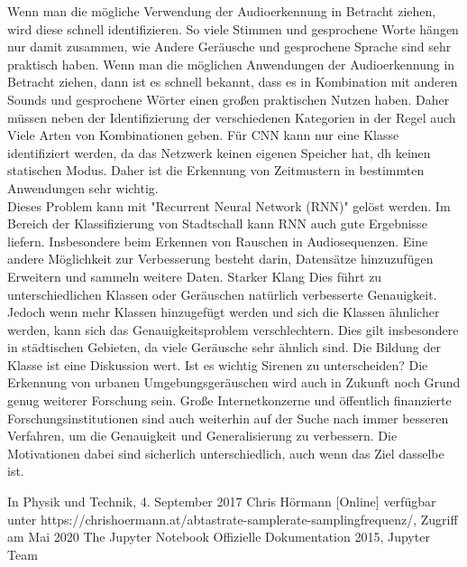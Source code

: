 \documentclass[a4paper,11pt]{article}
\theoremstyle{mytheor}
\begin{document}
Wenn man die mögliche Verwendung der Audioerkennung in Betracht ziehen, wird diese schnell identifizieren. So viele Stimmen und gesprochene Worte hängen nur damit zusammen, wie Andere Geräusche und gesprochene Sprache sind sehr praktisch haben. 
Wenn man die möglichen Anwendungen der Audioerkennung in Betracht ziehen, dann ist es schnell bekannt, dass es in Kombination mit anderen Sounds und gesprochene Wörter einen großen praktischen Nutzen haben.
Daher müssen neben der Identifizierung der verschiedenen Kategorien in der Regel auch Viele Arten von Kombinationen geben. Für CNN kann nur eine Klasse identifiziert werden, da das Netzwerk keinen eigenen Speicher hat, dh keinen statischen Modus. Daher ist die Erkennung von Zeitmustern in bestimmten Anwendungen sehr wichtig. \\
Dieses Problem kann mit "Recurrent Neural Network (RNN)" gelöst werden. Im Bereich der Klassifizierung von Stadtschall kann RNN auch gute Ergebnisse liefern. Insbesondere beim Erkennen von Rauschen in Audiosequenzen. Eine andere Möglichkeit zur Verbesserung besteht darin, Datensätze hinzuzufügen Erweitern und sammeln weitere Daten. Starker Klang Dies führt zu unterschiedlichen Klassen oder Geräuschen natürlich verbesserte Genauigkeit. Jedoch wenn mehr Klassen hinzugefügt werden und sich die Klassen ähnlicher werden, kann sich das Genauigkeitsproblem verschlechtern. Dies gilt insbesondere in städtischen Gebieten, da viele Geräusche sehr ähnlich sind. Die Bildung der Klasse ist eine Diskussion wert. Ist es wichtig Sirenen
zu unterscheiden? Die Erkennung von urbanen Umgebungsgeräuschen wird auch in Zukunft noch Grund genug weiterer Forschung sein. Große Internetkonzerne und öffentlich finanzierte Forschungsinstitutionen
sind auch weiterhin auf der Suche nach immer besseren Verfahren, um die Genauigkeit und Generalisierung zu verbessern. Die Motivationen dabei sind sicherlich unterschiedlich, auch wenn das Ziel
dasselbe ist.
\newpage

\begin{thebibliography}{9}

 {In Physik und Technik, 4. September 2017
Chris Hörmann [Online] verfügbar unter https://chrishoermann.at/abtastrate-samplerate-samplingfrequenz/, Zugriff am Mai 2020}
 { The Jupyter Notebook Offizielle Dokumentation 2015, Jupyter Team}
 \end{thebibliography}
 
\end{document}
